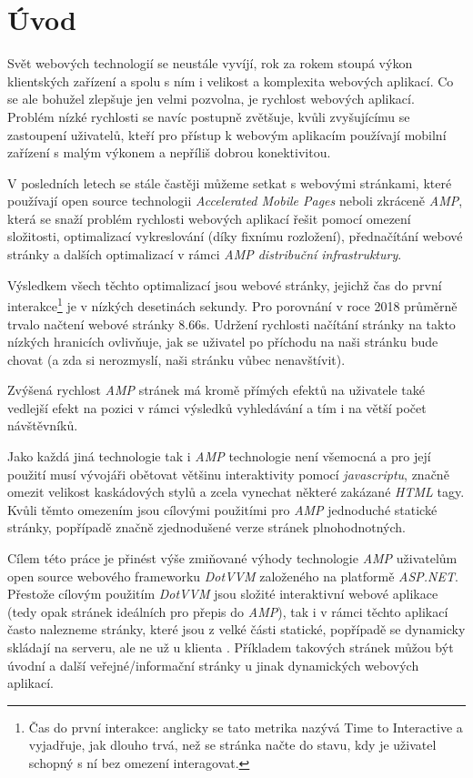 \chapter{Úvod}

Svět webových technologií se neustále vyvíjí, rok za rokem stoupá výkon klientských zařízení a spolu s
ním i velikost a komplexita webových aplikací. Co se ale bohužel zlepšuje jen velmi pozvolna, je rychlost
webových aplikací. Problém nízké rychlosti se navíc postupně zvětšuje, kvůli zvyšujícímu se zastoupení
uživatelů, kteří pro přístup k webovým aplikacím používají mobilní zařízení s malým výkonem a nepříliš
dobrou konektivitou.

V posledních letech se stále častěji můžeme setkat s webovými stránkami, které používají open source technologii \emph{Accelerated Mobile Pages} neboli zkráceně \emph{AMP}, která se snaží problém rychlosti webových aplikací
řešit pomocí omezení složitosti, optimalizací vykreslování (díky fixnímu rozložení), přednačítání webové
stránky a dalších optimalizací v rámci \emph{AMP distribuční infrastruktury}.

Výsledkem všech těchto optimalizací jsou webové stránky, jejichž čas do první interakce\footnote{Čas do první interakce: anglicky se tato metrika nazývá Time to Interactive a vyjadřuje, jak dlouho trvá, než se stránka načte do stavu, kdy je uživatel schopný s ní bez omezení interagovat.} je v nízkých desetinách sekundy. Pro porovnání v roce 2018 průměrně trvalo načtení webové
stránky 8.66s\cite{TTI}.
Udržení rychlosti načítání stránky na takto nízkých hranicích ovlivňuje, jak se uživatel po příchodu na naši
stránku bude chovat (a zda si nerozmyslí, naši stránku vůbec nenavštívit).

Zvýšená rychlost \emph{AMP} stránek má kromě přímých efektů na uživatele také vedlejší efekt na pozici
v rámci výsledků vyhledávání a tím i na větší počet návštěvníků.

Jako každá jiná technologie tak i \emph{AMP} technologie není všemocná a pro její použití musí vývojáři
obětovat většinu interaktivity pomocí \emph{javascriptu}, značně omezit velikost kaskádových stylů a zcela
vynechat některé zakázané \emph{HTML} tagy. Kvůli těmto omezením jsou cílovými použitími pro \emph{AMP} jednoduché statické stránky, popřípadě značně
zjednodušené verze stránek plnohodnotných.

Cílem této práce je přinést výše zmiňované výhody technologie \emph{AMP} uživatelům open source webového
frameworku \emph{DotVVM} založeného na platformě \emph{ASP.NET}.
Přestože cílovým použitím \emph{DotVVM} jsou složité interaktivní webové aplikace (tedy opak stránek ideálních pro přepis do \emph{AMP}), tak i v rámci těchto aplikací často nalezneme stránky, které jsou z velké části statické, popřípadě se dynamicky skládají na serveru, ale ne už u klienta \cite{DotVVMIntro}. Příkladem takových stránek můžou být úvodní a další veřejné/informační stránky u jinak dynamických webových aplikací. 

